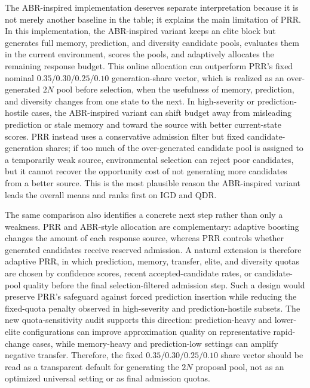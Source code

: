 \documentclass[1p,times]{elsarticle}
\begin{document}
The ABR-inspired implementation deserves separate interpretation because it is not merely another baseline in the table; it explains the main limitation of PRR. In this implementation, the ABR-inspired variant keeps an elite block but generates full memory, prediction, and diversity candidate pools, evaluates them in the current environment, scores the pools, and adaptively allocates the remaining response budget. This online allocation can outperform PRR's fixed nominal $0.35/0.30/0.25/0.10$ generation-share vector, which is realized as an over-generated $2N$ pool before selection, when the usefulness of memory, prediction, and diversity changes from one state to the next. In high-severity or prediction-hostile cases, the ABR-inspired variant can shift budget away from misleading prediction or stale memory and toward the source with better current-state scores. PRR instead uses a conservative admission filter but fixed candidate-generation shares; if too much of the over-generated candidate pool is assigned to a temporarily weak source, environmental selection can reject poor candidates, but it cannot recover the opportunity cost of not generating more candidates from a better source. This is the most plausible reason the ABR-inspired variant leads the overall means and ranks first on IGD and QDR.

The same comparison also identifies a concrete next step rather than only a weakness. PRR and ABR-style allocation are complementary: adaptive boosting changes the amount of each response source, whereas PRR controls whether generated candidates receive reserved admission. A natural extension is therefore adaptive PRR, in which prediction, memory, transfer, elite, and diversity quotas are chosen by confidence scores, recent accepted-candidate rates, or candidate-pool quality before the final selection-filtered admission step. Such a design would preserve PRR's safeguard against forced prediction insertion while reducing the fixed-quota penalty observed in high-severity and prediction-hostile subsets. The new quota-sensitivity audit supports this direction: prediction-heavy and lower-elite configurations can improve approximation quality on representative rapid-change cases, while memory-heavy and prediction-low settings can amplify negative transfer. Therefore, the fixed $0.35/0.30/0.25/0.10$ share vector should be read as a transparent default for generating the $2N$ proposal pool, not as an optimized universal setting or as final admission quotas.
\end{document}
